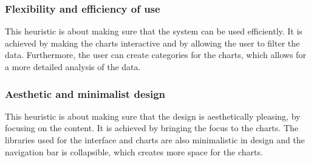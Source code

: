 \subsubsection{Flexibility and efficiency of use}\label{subsubsec:flexibility-and-efficiency-of-use}

This heuristic is about making sure that the system can be used efficiently.
It is achieved by making the charts interactive and by allowing the user to filter the data.
Furthermore, the user can create categories for the charts, which allows for a more detailed analysis of the data.

\subsubsection{Aesthetic and minimalist design}\label{subsubsec:aesthetic-and-minimalist-design}

This heuristic is about making sure that the design is aesthetically pleasing, by focusing on the content.
It is achieved by bringing the focus to the charts.
The libraries used for the interface and charts are also minimalistic in design and the navigation bar is collapsible,
which creates more space for the charts.
